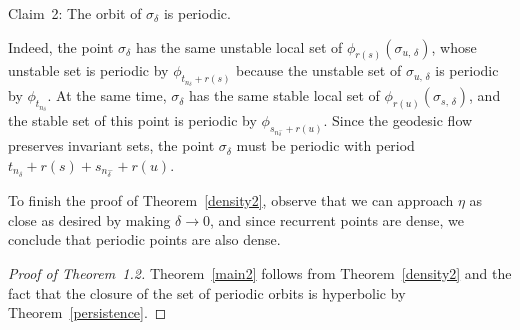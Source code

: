 \documentclass[10pt]{amsart}
\theoremstyle{definition}
\begin{document}
\begin{enonce*}[plain]{Claim~2}: The orbit of $\sigma_{\delta}$ is periodic.
\end{enonce*}

Indeed, the point $\sigma_{\delta}$ has the same unstable local set of $\phi_{r(s)}(\sigma_{u,\,\delta})$, whose unstable set is periodic by $\phi_{t_{n_{\delta}}+ r(s)}$ because the unstable set of $\sigma_{u,\,\delta}$ is periodic by $\phi_{t_{n_{\delta}}}$. At the same time, $\sigma_{\delta}$ has the same stable local set of $\phi_{r(u)}(\sigma_{s,\,\delta})$, and the stable set of this point is periodic by $\phi_{s_{n_{\delta}^{-}}+ r(u)}$. Since the geodesic flow preserves invariant sets, the point $\sigma_{\delta}$ must be periodic with period $t_{n_{\delta}}+ r(s) + s_{n_{\delta}^{-}} + r(u)$.

To finish the proof of Theorem~\ref{density2}, observe that we can approach $\eta$ as close as desired by making $\delta \rightarrow 0$, and since recurrent points are dense, we conclude that periodic points are also dense.

\begin{proof}[{Proof of Theorem~1.2}]
Theorem~\ref{main2} follows from Theorem~\ref{density2} and the fact that the closure of the set of periodic orbits is hyperbolic by Theorem~\ref{persistence}.
\end{proof}
\end{document}
